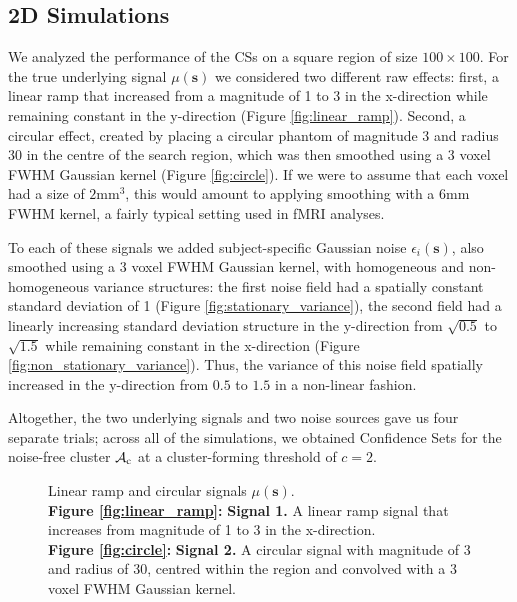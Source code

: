 \subsection{2D Simulations}
\label{sec:2D_simulations}
We analyzed the performance of the CSs on a square region of size $100 \times 100$. For the true underlying signal $\mu(\bm{s})$ we considered two different raw effects: first, a linear ramp that increased from a magnitude of 1 to 3 in the x-direction while remaining constant in the y-direction (Figure \ref{fig:linear_ramp}). Second, a circular effect, created by placing a circular phantom of magnitude 3 and radius 30 in the centre of the search region, which was then smoothed using a 3 voxel FWHM Gaussian kernel (Figure \ref{fig:circle}). If we were to assume that each voxel had a size of $2$mm$^{3}$, this would amount to applying smoothing with a $6$mm FWHM kernel, a fairly typical setting used in fMRI analyses.

To each of these signals we added subject-specific Gaussian noise $\epsilon_{i}(\bm{s})$, also smoothed using a 3 voxel FWHM Gaussian kernel, with homogeneous and non-homogeneous variance structures: the first noise field had a spatially constant standard deviation of 1 (Figure \ref{fig:stationary_variance}), the second field had a linearly increasing standard deviation structure in the y-direction from $\sqrt{0.5}$ to $\sqrt{1.5}$ while remaining constant in the x-direction (Figure \ref{fig:non_stationary_variance}). Thus, the variance of this noise field spatially increased in the y-direction from $0.5$ to $1.5$ in a non-linear fashion. 

Altogether, the two underlying signals and two noise sources gave us four separate trials; across all of the simulations, we obtained Confidence Sets for the noise-free cluster $\operatorname{\mathcal{A}_{c}}$ at a cluster-forming threshold of $c = 2$. 

\begin{figure}[htbp]\label{fig:2D_signals}%
\centering
{}
\caption{Linear ramp and circular signals $\mu(\bm{s})$. \\ \textbf{Figure \ref{fig:linear_ramp}:} \textbf{Signal 1.} A linear ramp signal that increases from magnitude of 1 to 3 in the x-direction. \\ \textbf{Figure \ref{fig:circle}:} \textbf{Signal 2.} A circular signal with magnitude of 3 and radius of 30, centred within the region and convolved with a 3 voxel FWHM Gaussian kernel.}
\end{figure}


